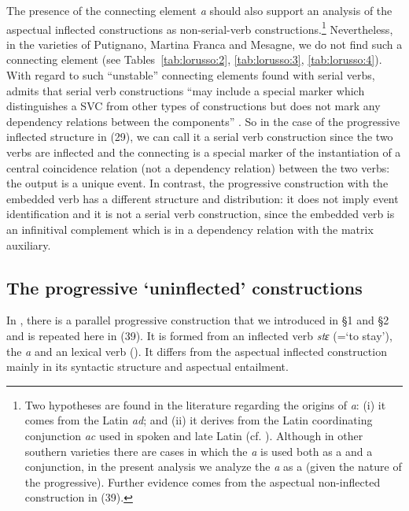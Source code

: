 \documentclass[output=paper]{langsci/langscibook}
\begin{document}
The presence of the connecting element \textit{a} should also support an analysis of the aspectual inflected constructions as non-serial-verb constructions.\footnote{Two hypotheses are found in the literature regarding the origins of \textit{a}: (i) it comes from the Latin  \textit{ad}; and (ii) it derives from the Latin coordinating conjunction \textit{ac} used in spoken and late Latin (cf. \citealt[§§710,761]{Rohlfs1969}). Although in other southern  varieties there are cases in which the \textit{a} is used both as a   and a conjunction, in the present analysis we analyze the \textit{a} as a   (given the  nature of the progressive). Further evidence comes from the aspectual non-inflected construction in (39).} Nevertheless, in the varieties of Putignano, Martina Franca and Mesagne, we do not find such a connecting element (see Tables~\ref{tab:lorusso:2}, \ref{tab:lorusso:3}, \ref{tab:lorusso:4}). With regard to such “unstable” connecting elements found with serial verbs, \citet{Aikhenvald2006} admits that serial verb constructions “may include a special marker which distinguishes a SVC from other types of constructions but does not mark any dependency relations between the components” \citep[20]{Aikhenvald2006}. So in the case of the  progressive inflected structure in (29), we can call it a serial verb construction since the two verbs are inflected and the connecting   is a special marker of the instantiation of a central coincidence relation (not a dependency relation) between the two verbs: the output is a unique event. In contrast, the progressive  construction with the embedded  verb has a different structure and distribution: it does not imply event identification and it is not a serial verb construction, since the embedded verb is an infinitival complement which is in a dependency relation with the matrix auxiliary. 

\subsection{The progressive `uninflected' constructions}%

In , there is a parallel progressive construction that we introduced in §1 and §2 and is repeated here in (39). It is formed from an inflected  verb \textit{stɛ} (=‘to stay’), the   \textit{a} and an  lexical verb (). It differs from the aspectual inflected construction mainly in its syntactic structure and aspectual entailment. 
\end{document}
